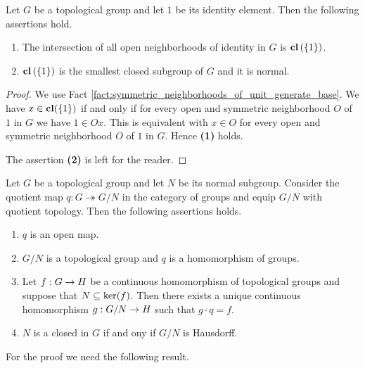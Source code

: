 \documentclass[10pt]{amsart}
\begin{document}
\begin{fact}\label{fact:closure_of_identity}
	Let $G$ be a topological group and let $1$ be its identity element. Then the following assertions hold.
	\begin{enumerate}[label=\emph{\textbf{(\arabic*)}}, leftmargin=*]
		\item The intersection of all open neighborhoods of identity in $G$ is $\mathbf{cl}\left(\{1\}\right)$.
		\item $\mathbf{cl}\left(\{1\}\right)$ is the smallest closed subgroup of $G$ and it is normal.
	\end{enumerate}
\end{fact}
\begin{proof}
	We use Fact \ref{fact:symmetric_neighborhoods_of_unit_generate_base}. We have $x \in \mathbf{cl}(\{1\})$ if and only if for every open and symmetric neighborhood $O$ of $1$ in $G$ we have $1 \in Ox$. This is equivalent with $x \in O$ for every open and symmetric neighborhood $O$ of $1$ in $G$. Hence \textbf{(1)} holds.

	The assertion \textbf{(2)} is left for the reader.
\end{proof}

\begin{theorem}\label{theorem:quotients_of_topological_groups}
	Let $G$ be a topological group and let $N$ be its normal subgroup. Consider the quotient map $q:G\twoheadrightarrow G/N$ in the category of groups and equip $G/N$ with quotient topology. Then the following assertions holds.
	\begin{enumerate}[label=\emph{\textbf{(\arabic*)}}, leftmargin=*]
		\item $q$ is an open map.
		\item $G/N$ is a topological group and $q$ is a homomorphism of groups.
		\item Let $f:G\rightarrow H$ be a continuous homomorphism of topological groups and suppose that $N \subseteq \mathrm{ker}(f)$. Then there exists a unique continuous homomorphism $g:G/N\rightarrow H$ such that $g\cdot q = f$.
		\item $N$ is a closed in $G$ if and ony if $G/N$ is Hausdorff.
	\end{enumerate}
\end{theorem}
\noindent
For the proof we need the following result.
\end{document}
